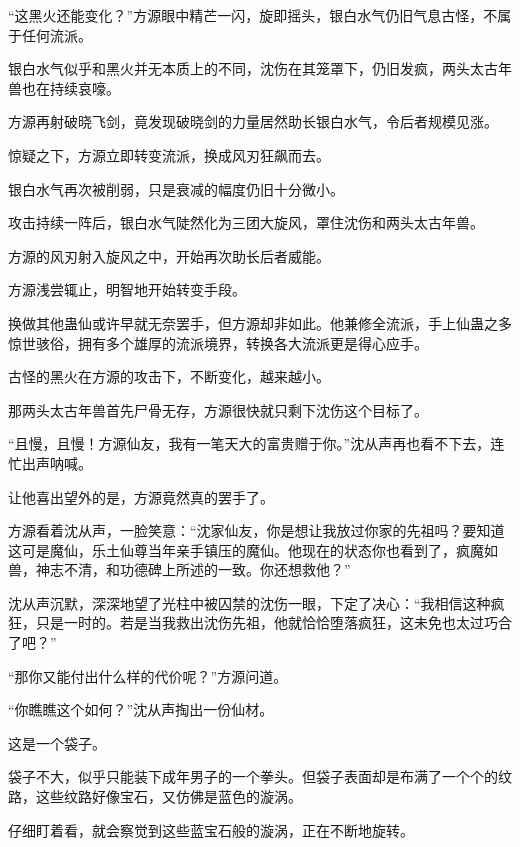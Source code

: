 
\begin{this_body}



“这黑火还能变化？”方源眼中精芒一闪，旋即摇头，银白水气仍旧气息古怪，不属于任何流派。

银白水气似乎和黑火并无本质上的不同，沈伤在其笼罩下，仍旧发疯，两头太古年兽也在持续哀嚎。

方源再射破晓飞剑，竟发现破晓剑的力量居然助长银白水气，令后者规模见涨。

惊疑之下，方源立即转变流派，换成风刃狂飙而去。

银白水气再次被削弱，只是衰减的幅度仍旧十分微小。

攻击持续一阵后，银白水气陡然化为三团大旋风，罩住沈伤和两头太古年兽。

方源的风刃射入旋风之中，开始再次助长后者威能。

方源浅尝辄止，明智地开始转变手段。

换做其他蛊仙或许早就无奈罢手，但方源却非如此。他兼修全流派，手上仙蛊之多惊世骇俗，拥有多个雄厚的流派境界，转换各大流派更是得心应手。

古怪的黑火在方源的攻击下，不断变化，越来越小。

那两头太古年兽首先尸骨无存，方源很快就只剩下沈伤这个目标了。

“且慢，且慢！方源仙友，我有一笔天大的富贵赠于你。”沈从声再也看不下去，连忙出声呐喊。

让他喜出望外的是，方源竟然真的罢手了。

方源看着沈从声，一脸笑意：“沈家仙友，你是想让我放过你家的先祖吗？要知道这可是魔仙，乐土仙尊当年亲手镇压的魔仙。他现在的状态你也看到了，疯魔如兽，神志不清，和功德碑上所述的一致。你还想救他？”

沈从声沉默，深深地望了光柱中被囚禁的沈伤一眼，下定了决心：“我相信这种疯狂，只是一时的。若是当我救出沈伤先祖，他就恰恰堕落疯狂，这未免也太过巧合了吧？”

“那你又能付出什么样的代价呢？”方源问道。

“你瞧瞧这个如何？”沈从声掏出一份仙材。

这是一个袋子。

袋子不大，似乎只能装下成年男子的一个拳头。但袋子表面却是布满了一个个的纹路，这些纹路好像宝石，又仿佛是蓝色的漩涡。

仔细盯着看，就会察觉到这些蓝宝石般的漩涡，正在不断地旋转。


\end{this_body}
